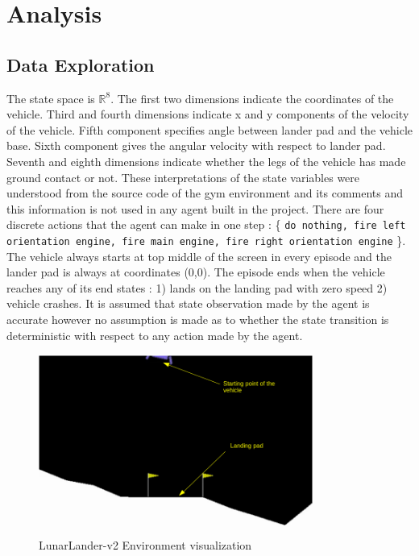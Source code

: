 \documentclass{article}
\begin{document}
\section{Analysis}
\subsection*{Data Exploration}
The state space is $\mathbb{R}^8$. The first two dimensions indicate the coordinates of the vehicle. Third and fourth dimensions indicate x and y components of the velocity of the vehicle. Fifth component specifies angle between lander pad and the vehicle base. Sixth component gives the angular velocity with respect to lander pad. Seventh and eighth dimensions indicate whether the legs of the vehicle has made ground contact or not. These interpretations of the state variables were understood from the source code of the gym environment and its comments and this information is not used in any agent built in the project. There are four discrete actions that the agent can make in one step : \{ \texttt{do nothing, fire left orientation engine, fire main engine, fire right orientation engine} \}. The vehicle always starts at top middle of the screen in every episode and the lander pad is always at coordinates (0,0). The episode ends when the vehicle reaches any of its end states : 1) lands on the landing pad with zero speed 2) vehicle crashes. It is assumed that state observation made by the agent is accurate however no assumption is made as to whether the state transition is deterministic with respect to any action made by the agent.
\begin{figure}[H]
	\caption{LunarLander-v2 Environment visualization}
	\centering
	\includegraphics[width=9cm]{img/env}
\end{figure}
\end{document}

